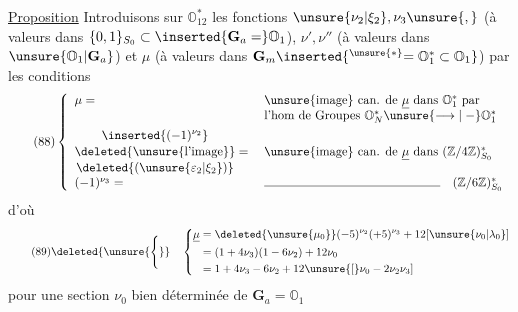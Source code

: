 \uline{Proposition} Introduisons sur  $\mathbb O_{12}^*$ les fonctions \inserted{$\underline{\mu}\mapsto$} $\unsure{\nu_2|\xi_2},\nu_3\unsure{,}$  (à valeurs dans $\{0,1\}_{S_0}\subset\inserted{\mathbf G_a=}\mathbb O_1$), $\nu',\nu''$  (à valeurs dans $\unsure{\mathbb O_1|\mathbf G_a}$) et $\mu$ (à valeurs dans $\mathbf G_m\inserted{^{\unsure{*}}=\mathbb O_1^*\subset\mathbb O_1}$)  par les conditions
\[
\tag{88}
\left\{\begin{array}{ll}
\mu={}&\text{\unsure{image} can. de }\underline{\mu}\text{ dans }\mathbb O_1^*\text{ par}\\
&\text{l'hom de Groupes }\mathbb O_N^*\unsure{\longrightarrow|\mathrel{-}}\mathbb O_1^*\\[4pt]
\begin{gathered}
\inserted{(-1)^{\nu_2}}\\[-2pt]
\deleted{\text{\unsure{l'image}}}\\[-2pt]
\deleted{(\unsure{\varepsilon_2|\xi_2})}
\end{gathered}={}&\text{\unsure{image} can. de }\underline{\mu}\text{ dans }(\mathbb Z/4\mathbb Z)^*_{S_0}\\[4pt]
(-1)^{\nu_3}={}&\rule{5cm}{0.4pt}\quad(\mathbb Z/6\mathbb Z)^*_{S_0}
\end{array}\right.
\]
d'où
\[
\tag{89}
\deleted{\unsure{\Bigg\{}}\quad
\left\{\begin{aligned}
\underline{\mu}&=\deleted{\unsure{\mu_0}}(-5)^{\nu_2}(+5)^{\nu_3}+12[\unsure{\nu_0|\lambda_0}]\\
&=(1+4\nu_3)(1-6\nu_2)+12\nu_0\\
&=1+4\nu_3-6\nu_2+12\unsure{[}\nu_0-2\nu_2\nu_3]
\end{aligned}\right.
\]
pour une section $\nu_0$ bien déterminée de $\mathbf G_a=\mathbb O_1$

